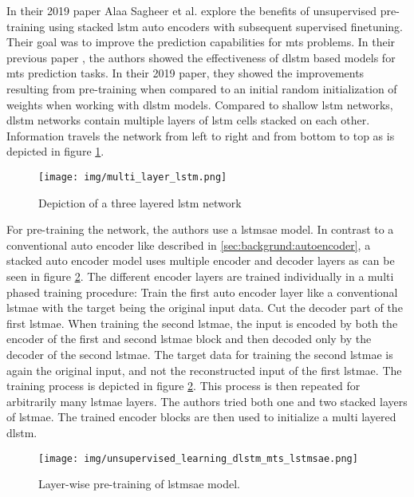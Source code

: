 In their 2019 paper \cite{unsupervised_learning_lstms_timeseries} Alaa Sagheer et al. explore the benefits of unsupervised pre-training using stacked \gls{lstm} auto encoders with subsequent supervised finetuning. Their goal was to improve the prediction capabilities for \gls{mts} problems. In their previous paper \cite{dlstm_time_series_forecasting}, the authors showed the effectiveness of \gls{dlstm} based models for \gls{mts} prediction tasks. In their 2019 paper, they showed the improvements resulting from pre-training when compared to an initial random initialization of weights when working with \gls{dlstm} models. Compared to shallow \gls{lstm} networks, \gls{dlstm} networks contain multiple layers of \gls{lstm} cells stacked on each other. Information travels the network from left to right and from bottom to top as is depicted in figure \ref{fig:stateofart:unsupervised_learning_with_lstms_dlstm}. 

\begin{figure}[h]
	\centering
	\texttt{[image: img/multi\_layer\_lstm.png]}
	\caption{Depiction of a three layered \gls{lstm} network}
	\label{fig:stateofart:unsupervised_learning_with_lstms_dlstm}
\end{figure}

For pre-training the network, the authors use a \gls{lstmsae} model. In contrast to a conventional auto encoder like described in \ref{sec:backgrund:autoencoder}, a stacked auto encoder model uses multiple encoder and decoder layers as can be seen in figure \ref{fig:stateofart:unsupervised_learning_dlstm_mts_lstmsae}. The different encoder layers are trained individually in a multi phased training procedure: Train the first auto encoder layer like a conventional \gls{lstmae} with the target being the original input data. Cut the decoder part of the first \gls{lstmae}. When training the second \gls{lstmae}, the input is encoded by both the encoder of the first and second \gls{lstmae} block and then decoded only by the decoder of the second \gls{lstmae}. The target data for training the second \gls{lstmae} is again the original input, and not the reconstructed input of the first \gls{lstmae}. The training process is depicted in figure \ref{fig:stateofart:unsupervised_learning_dlstm_mts_lstmsae}. This process is then repeated for arbitrarily many \gls{lstmae} layers. The authors tried both one and two stacked layers of \gls{lstmae}. The trained encoder blocks are then used to initialize a multi layered \gls{dlstm}.

\begin{figure}[h]
	\centering
	\texttt{[image: img/unsupervised\_learning\_dlstm\_mts\_lstmsae.png]}
	\caption{Layer-wise pre-training of \gls{lstmsae} model. \cite{unsupervised_learning_lstms_timeseries}}
	\label{fig:stateofart:unsupervised_learning_dlstm_mts_lstmsae}
\end{figure}

